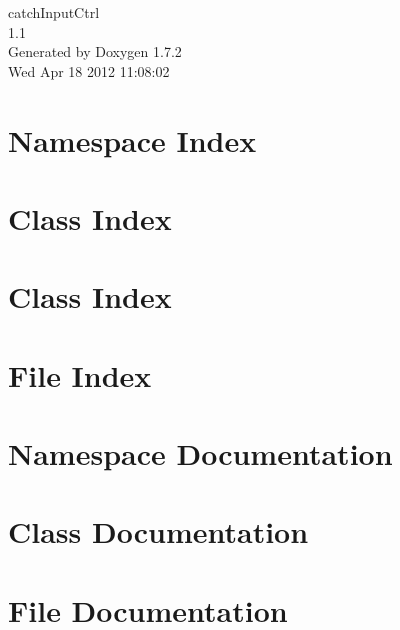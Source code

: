 \documentclass[a4paper]{book}
\begin{document}
\hypersetup{pageanchor=false}
\begin{titlepage}
\vspace*{7cm}
\begin{center}
{\Large catchInputCtrl \\[1ex]\large 1.1 }\\
\vspace*{1cm}
{\large Generated by Doxygen 1.7.2}\\
\vspace*{0.5cm}
{\small Wed Apr 18 2012 11:08:02}\\
\end{center}
\end{titlepage}
\clearemptydoublepage
{}
\tableofcontents
\clearemptydoublepage
{}
\hypersetup{pageanchor=true}
\chapter{Namespace Index}

\chapter{Class Index}

\chapter{Class Index}

\chapter{File Index}

\chapter{Namespace Documentation}

\chapter{Class Documentation}




\chapter{File Documentation}










\printindex
\end{document}
